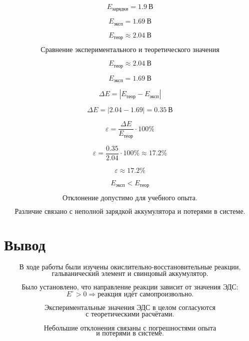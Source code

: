 \documentclass[a4paper, 12pt]{article}
\begin{document}
\[
    E_{\text{зарядки}} = 1.9\ \mathrm{В}
\]

\[
    E_{\text{эксп}} = 1.69\ \mathrm{В}
\]

\[
    E_{\text{теор}} \approx 2.04\ \mathrm{В}
\]

\[
    \boxed{\text{Сравнение экспериментального и теоретического значения}}
\]

\[
    E_{\text{теор}} \approx 2.04\ \mathrm{В}
\]

\[
    E_{\text{эксп}} = 1.69\ \mathrm{В}
\]

\[
    \Delta E =
    \left|E_{\text{теор}} - E_{\text{эксп}}\right|
\]

\[
    \Delta E =
    \left|2.04 - 1.69\right|
    =
    0.35\ \mathrm{В}
\]

\[
    \varepsilon =
    \frac{\Delta E}{E_{\text{теор}}}\cdot 100\%
\]

\[
    \varepsilon =
    \frac{0.35}{2.04}\cdot 100\%
    \approx
    17.2\%
\]

\[
    \boxed{
        \varepsilon \approx 17.2\%
    }
\]

\[
    \boxed{
        E_{\text{эксп}} < E_{\text{теор}}
    }
\]

\[
    \boxed{
        \text{Отклонение допустимо для учебного опыта.}
    }
\]

\[
    \boxed{
        \text{Различие связано с неполной зарядкой аккумулятора и потерями в системе.}
    }
\]

\section*{Вывод}

\[
    \text{В ходе работы были изучены окислительно-восстановительные реакции,}
\]
\[
    \text{гальванический элемент и свинцовый аккумулятор.}
\]

\[
    \text{Было установлено, что направление реакции зависит от значения ЭДС:}
\]
\[
    E^\circ > 0 \Rightarrow \text{реакция идёт самопроизвольно.}
\]

\[
    \text{Экспериментальные значения ЭДС в целом согласуются}
\]
\[
    \text{с теоретическими расчётами.}
\]

\[
    \text{Небольшие отклонения связаны с погрешностями опыта}
\]
\[
    \text{и потерями в системе.}
\]
\end{document}
